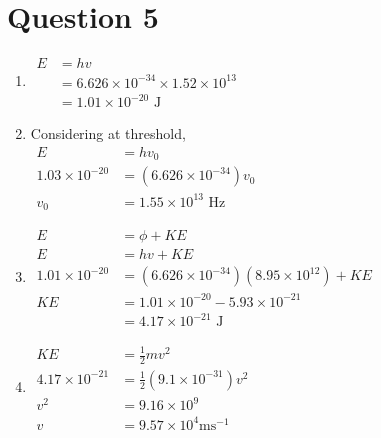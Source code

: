 \documentclass[a4paper, fleqn]{article}
\begin{document}
\pagebreak

\section{Question 5}
\begin{enumerate}[label=(\alph{*})]
\item $\begin{aligned}E&=hv\\&=6.626\times10^{-34}\times1.52\times10^{13}\\&=1.01\times10^{-20}\text{ J}\end{aligned}$
\item Considering at threshold,\\
$\begin{aligned}E&=hv_0\\1.03\times10^{-20}&=(6.626\times10^{-34})v_0\\v_0&=1.55\times10^{13}\text{ Hz}\end{aligned}$
\item $\begin{aligned}E&=\phi+KE\\E&=hv+KE\\1.01\times10^{-20}&=(6.626\times10^{-34})(8.95\times10^{12})+KE\\KE&=1.01\times10^{-20}-5.93\times10^{-21}\\&=4.17\times10^{-21}\text{ J}\end{aligned}$
\item $\begin{aligned}KE&=\frac{1}{2}mv^2\\4.17\times10^{-21}&=\frac{1}{2}(9.1\times10^{-31})v^2\\v^2&=9.16\times10^9\\v&=9.57\times10^4\text{ms}^{-1}\end{aligned}$
\end{enumerate}

\pagebreak
\end{document}
